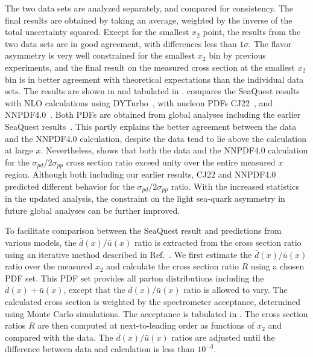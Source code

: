 \documentclass[reprint,aps,unsortedaddress,superscriptaddress,prl,floatfix,showpacs,linenumbers]{revtex4-2}
\begin{document}
The two data sets are analyzed separately, and compared for consistency.
The final results are obtained by taking an average,
weighted by the inverse of the total uncertainty squared.
Except for the smallest $x_2$ point, the results from the two data sets are in good agreement,
with differences less than $1\sigma$.
The flavor asymmetry is very well constrained for the smallest $x_2$ bin by previous experiments,
and the final result on the measured cross section at the smallest $x_2$ bin is in better agreement
with theoretical expectations than the individual data sets.
The results are shown in  and tabulated in .
 compares the SeaQuest results with
NLO calculations using DYTurbo~\cite{camarda2020},
with nucleon PDFs  CJ22~\cite{accardi2023}, and NNPDF4.0~\cite{ball2022a}.
Both PDFs are obtained from global analyses including
the earlier SeaQuest results~\cite{dove2021}.
This partly explains the better agreement between the data and the NNPDF4.0 calculation,
despite the data tend to lie above the calculation at large $x$.
Nevertheless, 
shows that both the data and the NNPDF4.0 calculation for the
$\sigma_{pd}/2\sigma_{pp}$ cross section ratio exceed unity over the
entire measured $x$ region.
Although both including our earlier results,
CJ22 and NNPDF4.0 predicted different behavior for the $\sigma_{pd}/2\sigma_{pp}$ ratio.
With the increased statistics in the updated analysis,
the constraint on the light sea-quark asymmetry in future global analyses can be further improved.

To facilitate comparison between the SeaQuest result and predictions
from various models, the $\bar{d}(x)/\bar{u}(x)$ ratio is extracted from the
cross section ratio using an iterative method described in
Ref.~\cite{dove2021}.
We first estimate the $\bar{d}(x)/\bar{u}(x)$ ratio over the measured $x_2$
and calculate the cross section ratio $R$ using a chosen PDF set.
This PDF set provides all parton distributions including the
$\bar{d}(x)+\bar{u}(x)$, except that the $\bar{d}(x)/\bar{u}(x)$
ratio is allowed to vary.
The calculated cross section is weighted by the spectrometer acceptance, determined using Monte Carlo simulations.
The acceptance is tabulated in .
The cross section ratios $R$ are then computed at next-to-leading order
as functions of $x_2$ and compared with the data. The $\bar{d}(x)/\bar{u}(x)$
ratios are adjusted until the difference between data and
calculation is less than $10^{-3}$.
\end{document}
